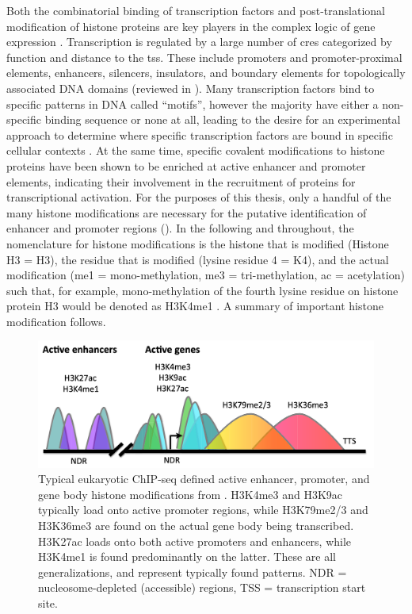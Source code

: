 Both the combinatorial binding of transcription factors and post-translational modification of histone proteins are key players in the complex logic of gene expression \cite{Farnham2009}. Transcription is regulated by a large number of \glspl{cre} categorized by function and distance to the \gls{tss}. These include promoters and promoter-proximal elements, enhancers, silencers, insulators, and boundary elements for topologically associated DNA domains (reviewed in \textcite{Wittkopp2011}). Many transcription factors bind to specific patterns in DNA called ``motifs'', however the majority have either a non-specific binding sequence or none at all, leading to the desire for an experimental approach to determine where specific transcription factors are bound in specific cellular contexts \cite{Spitz2012}. At the same time, specific covalent modifications to histone proteins have been shown to be enriched at active enhancer and promoter elements, indicating their involvement in the recruitment of proteins for transcriptional activation. For the purposes of this thesis, only a handful of the many histone modifications are necessary for the putative identification of enhancer and promoter regions (). In the following and throughout, the nomenclature for histone modifications is the histone that is modified (Histone H3 = H3), the residue that is modified (lysine residue 4 = K4), and the actual modification (me1 = mono-methylation, me3 = tri-methylation, ac = acetylation) such that, for example, mono-methylation of the fourth lysine residue on histone protein H3 would be denoted as H3K4me1 \cite{Gates2017}. A summary of important histone modification follows.

\begin{figure}
    \centering
    \includegraphics[width=\textwidth]{plot/ch1/histones}
    \caption{Typical eukaryotic ChIP-seq defined active enhancer, promoter, and gene body histone modifications from \textcite{Gates2017}. H3K4me3 and H3K9ac typically load onto active promoter regions, while H3K79me2/3 and H3K36me3 are found on the actual gene body being transcribed. H3K27ac loads onto both active promoters and enhancers, while H3K4me1 is found predominantly on the latter. These are all generalizations, and represent typically found patterns. NDR = nucleosome-depleted (accessible) regions, TSS = transcription start site.}
    \label{fig:histones}
\end{figure}

